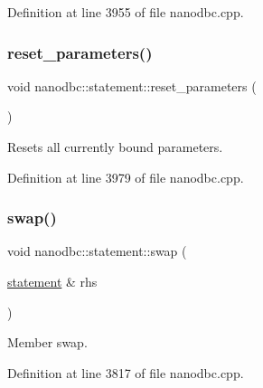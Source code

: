 Definition at line 3955 of file nanodbc.\+cpp.

\mbox{\label{classnanodbc_1_1statement_ae225c1ec30fb1095f96f207fab2a8793}} 
\subsubsection{\texorpdfstring{reset\_parameters()}{reset\_parameters()}}
{\footnotesize\ttfamily void nanodbc\+::statement\+::reset\+\_\+parameters (\begin{DoxyParamCaption}{ }\end{DoxyParamCaption})\hspace{0.3cm}{\ttfamily [noexcept]}}



Resets all currently bound parameters. 



Definition at line 3979 of file nanodbc.\+cpp.

\mbox{\label{classnanodbc_1_1statement_aaeb282293b92d0c9c0dc9e6452c91695}} 
\subsubsection{\texorpdfstring{swap()}{swap()}}
{\footnotesize\ttfamily void nanodbc\+::statement\+::swap (\begin{DoxyParamCaption}\item[{\mbox{\hyperlink{classnanodbc_1_1statement}{statement}} \&}]{rhs }\end{DoxyParamCaption})\hspace{0.3cm}{\ttfamily [noexcept]}}



Member swap. 



Definition at line 3817 of file nanodbc.\+cpp.

\mbox{\label{classnanodbc_1_1statement_adbd1acbbdcc529dc668bfef341593573}} 
